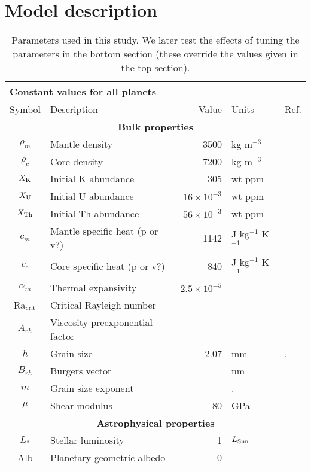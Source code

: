 \section{Model description}


\begin{table}
\centering
\caption{Parameters used in this study. We later test the effects of tuning the parameters in the bottom section (these override the values given in the top section). \label{tab:params}}

\begin{tabular}{@{} c l r l p{4cm} @{}}
\multicolumn{5}{l}{\textbf{Constant values for all planets}} \\
\toprule
Symbol & Description & Value & Units & Ref. \\
\midrule
\multicolumn{5}{c}{\textbf{Bulk properties}} \\
$\rho_m$ & Mantle density & 3500 & kg m$^{-3}$ & \citet{Thiriet2019} \\
$\rho_c$ & Core density & 7200 & kg m$^{-3}$ &  \citet{Thiriet2019}  \\
$X_{\rm K}$ & Initial K abundance &  305 & wt ppm  & \citet{Jaupart2015} \\
$X_{\rm U}$ & Initial U abundance &  $16 \times 10^{-3}$ & wt ppm  & \citet{Jaupart2015} \\
$X_{\rm Th}$ & Initial Th abundance &  $56 \times 10^{-3}$ & wt ppm  & \citet{Jaupart2015} \\
$c_m$ & Mantle specific heat (p or v?) & 1142 & J kg$^{-1}$ K$^{-1}$  & \citet{Thiriet2019}  \\
$c_c$ & Core specific heat (p or v?) & 840 & J kg$^{-1}$ K$^{-1}$  & \citet{Thiriet2019}  \\
$\alpha_m$ & Thermal expansivity &  $2.5 \times 10^{-5}$ &   & \citet{Thiriet2019}  \\
Ra$_{\rm crit}$ & Critical Rayleigh number &  &  & \citet{Thiriet2019}  \\
$A_{rh}$ & Viscosity preexponential factor & & & \citet{Karato1993} \\
$h$ & Grain size & 2.07 & mm & . \\
$B_{rh}$ & Burgers vector &  & nm & \citet{Karato1993} \\
$m$ & Grain size exponent &  & . & \citet{Karato1993} \\
$\mu$ & Shear modulus & 80 & GPa & \citet{Karato1993} \\

\multicolumn{5}{c}{\textbf{Astrophysical properties}} \\
$L_*$ & Stellar luminosity & 1 & $L_{\rm Sun}$ &  \\
Alb & Planetary geometric albedo & 0 & &  \\
\bottomrule
\end{tabular}




\end{table}
